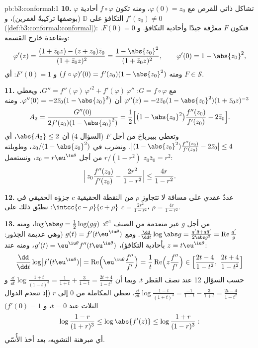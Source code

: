 \begin{solution}{pb:b3:conformal:1}
\textbf{10.} $\varphi$ تشاكل ذاتي للقرص مع $\varphi(0) = z_0$، ومنه تكون
$f\circ\varphi$ أحادية التكافؤ على $\mathbb D$ (بوصفها تركيبةً
لغمرين)، و $f'(z_0) \neq
0$ (\cref{def:b3:conformal:conformal}): فتكون $F$ معرَّفة جيدًا
وأحادية التكافؤ. و $F(0) = 0$. وبقاعدة خارج القسمة:
\[
\varphi'(z) = \frac{(1 + \bar z_0z) - (z + z_0)\bar z_0}
{(1 + \bar z_0z)^2}
= \frac{1 - \abs{z_0}^2}{(1 + \bar z_0z)^2},
\qquad \varphi'(0) = 1 - \abs{z_0}^2 ,
\]
ومنه $(f\circ\varphi)'(0) = f'(z_0)(1 - \abs{z_0}^2)$ و $F'(0) = 1$: أي $F \in \mathcal S$.

\textbf{11.} مع $G = f\circ\varphi$: $G'' =
f''(\varphi)\,\varphi'^2 + f'(\varphi)\,\varphi''$، ويعطي $\varphi''(z) = -2\bar z_0(1 - \abs{z_0}^2)(1 + \bar
z_0z)^{-3}$ أن $\varphi''(0) = -2\bar z_0(1 -
\abs{z_0}^2)$.
ومنه
\[
A_2 = \frac{G''(0)}{2f'(z_0)(1 - \abs{z_0}^2)}
= \frac12\Bigl[\bigl(1 - \abs{z_0}^2\bigr)
\frac{f''(z_0)}{f'(z_0)} - 2\bar z_0\Bigr] .
\]
وتعطي بيبرباخ من أجل $F$ (السؤال 4) أن $\abs{A_2} \leq 2$، أي $\bigl|(1 - \abs{z_0}^2)\frac{f''(z_0)}{f'(z_0)} - 2\bar
z_0\bigr| \leq 4$.
ونضرب في $z_0/(1 - \abs{z_0}^2)$، وطويلته $r/(1 - r^2)$ من أجل $z_0 = r\eu^{\iu\theta}$،
ونستعمل $z_0\bar
z_0 = r^2$:
\[
\Bigl|\,z_0\frac{f''(z_0)}{f'(z_0)} -
\frac{2r^2}{1 - r^2}\Bigr| \leq \frac{4r}{1 - r^2} .
\]

\textbf{12.} عددٌ عقدي على مسافة لا تتجاوز $\rho$ من النقطة الحقيقية
$c$ جزؤه الحقيقي في $\intcc{c - \rho}{c +
\rho}$: نطبّق ذلك على $c = \frac{2r^2}{1-r^2}$، $\rho =
\frac{4r}{1-r^2}$.

\textbf{13.} من أجل $g$ غير منعدمة من الصنف $\mathcal C^1$:
$\log\abs g = \frac12\log(g\bar g)$، ومنه $\frac{\dd}{\dd
t}\log\abs g = \frac{g'\bar g + g\bar g'}{2\abs g^2} =
\operatorname{Re}\frac{g'}g$. ومع $g(t) =
f'(t\eu^{\iu\theta})$ (وهي عديمة الجذور:
بأحادية التكافؤ)، $g'(t) =
\eu^{\iu\theta}f''(t\eu^{\iu\theta})$، ومنه عند $z =
t\eu^{\iu\theta}$:
\[
\frac{\dd}{\dd t}\log\bigl|f'(t\eu^{\iu\theta})\bigr|
= \operatorname{Re}\Bigl(\eu^{\iu\theta}
\frac{f''}{f'}\Bigr)
= \frac1t\operatorname{Re}\Bigl(z\frac{f''}{f'}\Bigr)
\in \Bigl[\frac{2t - 4}{1 - t^2},\
\frac{2t + 4}{1 - t^2}\Bigr]
\]
حسب السؤال 12 عند نصف القطر $t$. وبما أن $\frac{\dd}{\dd
t}\log\frac{1+t}{(1-t)^3} = \frac1{1+t} + \frac3{1-t} =
\frac{2t+4}{1-t^2}$ و $\frac{\dd}{\dd
t}\log\frac{1-t}{(1+t)^3} = \frac{-1}{1-t} - \frac3{1+t} =
\frac{2t-4}{1-t^2}$،
تعطي المكاملة من $0$ إلى $r$ (إذ تنعدم الدوال الثلاث عند
$t = 0$، و $f'(0) = 1$)
\[
\log\frac{1-r}{(1+r)^3} \leq \log\abs{f'(z)} \leq
\log\frac{1+r}{(1-r)^3} :
\]
أي مبرهنة التشويه، بعد أخذ الأُسّي.


\end{solution}
